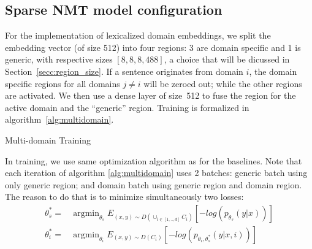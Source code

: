 \documentclass[11pt,a4paper]{article}
\DeclareMathOperator*{\argmin}{argmin}
\newcommand{\fyTodo}[1]{\Todo[FY:]{\textcolor{orange}{#1}}}
\begin{document}
\subsection{Sparse NMT model configuration}\fyTodo{Change sparse.}
\fyTodo{Motivate the split - discuss experimentally embedding size}
For the implementation of lexicalized domain embeddings, we split the embedding vector (of size 512) into four regions: 3 are domain specific and 1 is generic, with respective sizes $[8,8,8,488]$, a choice that will be dicussed in Section~\ref{secc:region_size}. If a sentence originates from domain $i$, the domain specific regions for all domains $j \neq i$ will be zeroed out; while the other regions are activated. We then use a dense layer of size~512 to fuse the region for the active domain and the ``generic'' region. Training is formalized in algorithm~\ref{alg:multidomain}.\fyTodo{Notation B for batch size}

\begin{algorithm}[h]
\caption{Multi-domain Training}
\label{alg:multidomain}
\begin{algorithmic}[1]
\REPEAT 
{}
\end{algorithmic}
\end{algorithm}

In training, we use same optimization algorithm as for the baselines. Note that each iteration of algorithm \ref{alg:multidomain} uses 2 batches: generic batch using only generic region; and domain batch using generic region and domain region. The reason to do that is to minimize simultaneously two losses:
\begin{align*}
\theta^*_{s}=&\displaystyle{\mathop{\argmin}_{\theta_s}}E_{(x,y) \sim D(\displaystyle{\mathop{\cup}_{i \in [1,..,d]}}C_{i})}[-log(p_{\theta_s}(y|x))] \\ 
 \theta^*_{i}=&\displaystyle{\mathop{\argmin}_{\theta_i}}E_{(x,y) \sim D(C_{i})}[-log(p_{\theta_i,\theta^*_s}(y|x,i))]
\end{align*} 
\end{document}
